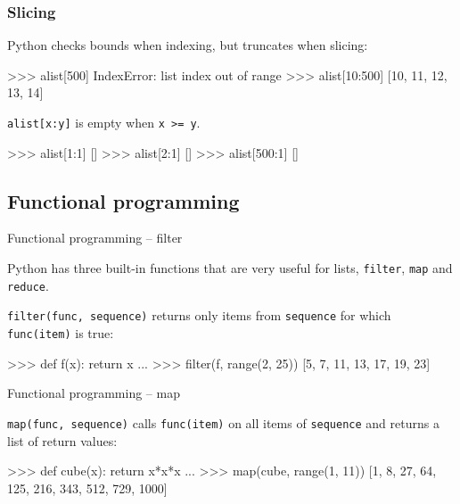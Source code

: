 \documentclass[xetex,10pt]{beamer}
\def\pythoni{\lstinline[language=pythontim]}
\def\spacer{\vspace*{1em}}
\begin{document}
\begin{frame}[fragile]
	\frametitle{Slicing}

Python checks bounds when indexing, but truncates when slicing:

\begin{python}
>>> alist[500]
IndexError: list index out of range
>>> alist[10:500]
[10, 11, 12, 13, 14]
\end{python}

	\spacer

\pause
\pythoni{alist[x:y]} is empty when \pythoni{x >= y}.

\begin{python}
>>> alist[1:1]
[]
>>> alist[2:1]
[]
>>> alist[500:1]
[]
\end{python}

\end{frame}

\subsection{Functional programming}

\begin{frame}[fragile]{Functional programming -- filter}
	
	Python has three built-in functions that are very useful for lists, \pythoni{filter}, \pythoni{map} and \pythoni{reduce}.
	
	\spacer
	
	\pythoni{filter(func, sequence)} returns only items from \pythoni{sequence} for which \pythoni{func(item)} is true:
	
	\spacer
	
	\begin{python}
	>>> def f(x): return x %
	...
	>>> filter(f, range(2, 25))
	[5, 7, 11, 13, 17, 19, 23]
	\end{python}
\end{frame}

\begin{frame}[fragile]{Functional programming -- map}

	\pythoni{map(func, sequence)} calls \pythoni{func(item)} on all items of \pythoni{sequence} and returns a list of return values:

	\spacer
	
	\begin{python}
>>> def cube(x): return x*x*x
...
>>> map(cube, range(1, 11))
[1, 8, 27, 64, 125, 216, 343, 512, 729, 1000]
	\end{python}
\end{frame}
\end{document}
